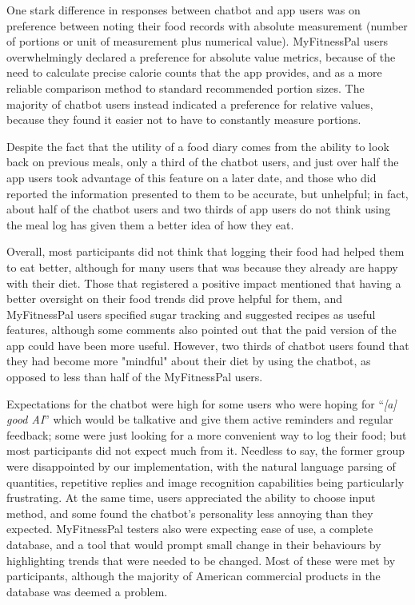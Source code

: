 One stark difference in responses between chatbot and app users was on preference between noting their food records with absolute measurement (number of portions or unit of measurement plus numerical value). MyFitnessPal users overwhelmingly declared a preference for absolute value metrics, because of the need to calculate precise calorie counts that the app provides, and as a more reliable comparison method to standard recommended portion sizes. The majority of chatbot users instead indicated a preference for relative values, because they found it easier not to have to constantly measure portions. 

Despite the fact that the utility of a food diary comes from the ability to look back on previous meals, only a third of the chatbot users, and just over half the app users took advantage of this feature on a later date, and those who did reported the information presented to them to be accurate, but unhelpful; in fact, about half of the chatbot users and two thirds of app users do not think using the meal log has given them a better idea of how they eat. 

Overall, most participants did not think that logging their food had helped them to eat better, although for many users that was because they already are happy with their diet. Those that registered a positive impact mentioned that having a better oversight on their food trends did prove helpful for them, and MyFitnessPal users specified sugar tracking and suggested recipes as useful features, although some comments also pointed out that the paid version of the app could have been more useful. However, two thirds of chatbot users found that they had become more "mindful" about their diet by using the chatbot, as opposed to less than half of the MyFitnessPal users. 

Expectations for the chatbot were high for some users who were hoping for ``\textit{[a] good AI}'' which would be talkative and give them active reminders and regular feedback; some were just looking for a more convenient way to log their food; but most participants did not expect much from it. Needless to say, the former group were disappointed by our implementation, with the natural language parsing of quantities, repetitive replies and image recognition capabilities being particularly frustrating. At the same time, users appreciated the ability to choose input method, and some found the chatbot's personality less annoying than they expected. MyFitnessPal testers also were expecting ease of use, a complete database, and a tool that would prompt small change in their behaviours by highlighting trends that were needed to be changed. Most of these were met by participants, although the majority of American commercial products in the database was deemed a problem. 

